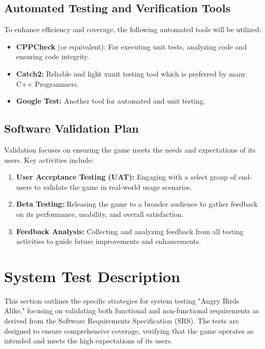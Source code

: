 \documentclass[12pt]{article}
\begin{document}
\subsection{Automated Testing and Verification Tools}
To enhance efficiency and coverage, the following automated tools will be utilized:

\begin{itemize}
    \item \textbf{CPPCheck} (or equivalent): For executing unit tests, analyzing code and ensuring code integrity.
    \item \textbf{Catch2:} Reliable and light xunit testing tool which is preferred by many C++ Programmers.
    \item \textbf{Google Test:} Another tool for automated and unit testing.
\end{itemize}

\subsection{Software Validation Plan}
Validation focuses on ensuring the game meets the needs and expectations of its users. Key activities include:

\begin{enumerate}
    \item \textbf{User Acceptance Testing (UAT):} Engaging with a select group of end-users to validate the game in real-world usage scenarios.
    \item \textbf{Beta Testing:} Releasing the game to a broader audience to gather feedback on its performance, usability, and overall satisfaction.
    \item \textbf{Feedback Analysis:} Collecting and analyzing feedback from all testing activities to guide future improvements and enhancements.
\end{enumerate}

\section{System Test Description}

This section outlines the specific strategies for system testing "Angry Birds Alike," focusing on validating both functional and non-functional requirements as derived from the Software Requirements Specification (SRS). The tests are designed to ensure comprehensive coverage, verifying that the game operates as intended and meets the high expectations of its users.
\end{document}
